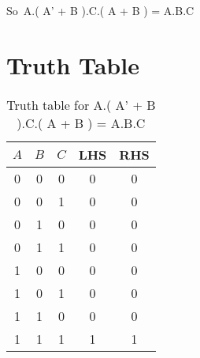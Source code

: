\documentclass[10pt,a4paper]{article}
\begin{document}
 \begin{center}
     So\hspace{0.3cm}\ A.( A' + B ).C.( A + B ) = A.B.C\\
\end{center}

\section*{Truth Table}
\begin{table}[h]
    \centering
    \begin{tabular}{|c|c|c|c|c|}
        \hline
        $A$&$B$&$C$&LHS&RHS \\
        \hline
         0&0&0&0&0 \\
         0&0&1&0&0 \\
         0&1&0&0&0 \\
         0&1&1&0&0 \\
         1&0&0&0&0 \\
         1&0&1&0&0 \\
         1&1&0&0&0 \\
         1&1&1&1&1 \\
         \hline
    \end{tabular}
    \caption{Truth table for A.( A' + B ).C.( A + B ) = A.B.C}
    \label{tab:my_label}
\end{table}
\end{document}
